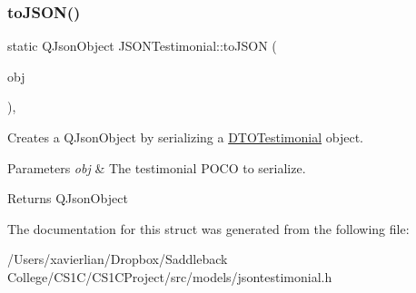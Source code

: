 \subsubsection{\texorpdfstring{toJSON()}{toJSON()}}
{\footnotesize\ttfamily static Q\+Json\+Object J\+S\+O\+N\+Testimonial\+::to\+J\+S\+ON (\begin{DoxyParamCaption}\item[{const \mbox{\hyperlink{struct_d_t_o_testimonial}{D\+T\+O\+Testimonial}}}]{obj }\end{DoxyParamCaption})\hspace{0.3cm}{\ttfamily [inline]}, {\ttfamily [static]}}



Creates a Q\+Json\+Object by serializing a \mbox{\hyperlink{struct_d_t_o_testimonial}{D\+T\+O\+Testimonial}} object. 


\begin{DoxyParams}{Parameters}
{\em obj} & The testimonial P\+O\+CO to serialize. \\
\hline
\end{DoxyParams}
\begin{DoxyReturn}{Returns}
Q\+Json\+Object 
\end{DoxyReturn}


The documentation for this struct was generated from the following file\+:\begin{DoxyCompactItemize}
\item 
/\+Users/xavierlian/\+Dropbox/\+Saddleback College/\+C\+S1\+C/\+C\+S1\+C\+Project/src/models/jsontestimonial.\+h\end{DoxyCompactItemize}
